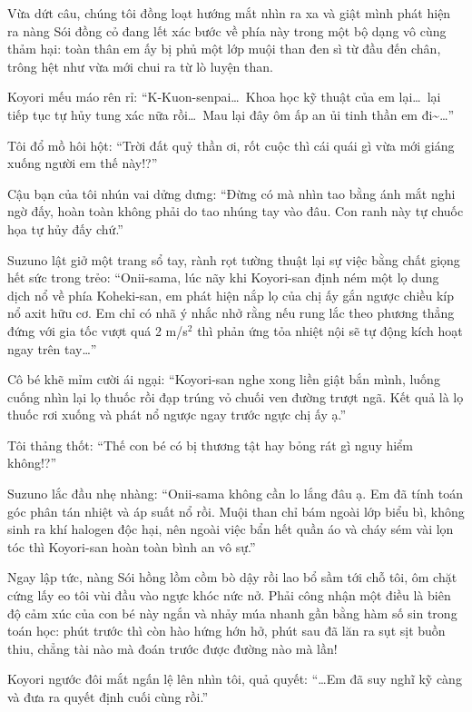 \documentclass[../main.tex]{subfiles}
\begin{document}
Vừa dứt câu, chúng tôi đồng loạt hướng mắt nhìn ra xa và giật mình phát hiện ra nàng Sói đồng cỏ đang lết xác bước về phía này trong một bộ dạng vô cùng thảm hại: toàn thân em ấy bị phủ một lớp muội than đen sì từ đầu đến chân, trông hệt như vừa mới chui ra từ lò luyện than.

Koyori mếu máo rên rỉ: ``K-Kuon-senpai\dots\ Khoa học kỹ thuật của em lại\dots\ lại tiếp tục tự hủy tung xác nữa rồi\dots\ Mau lại đây ôm ấp an ủi tinh thần em đi\~{}\dots''

Tôi đổ mồ hôi hột: ``Trời đất quỷ thần ơi, rốt cuộc thì cái quái gì vừa mới giáng xuống người em thế này!?''

Cậu bạn của tôi nhún vai dửng dưng: ``Đừng có mà nhìn tao bằng ánh mắt nghi ngờ đấy, hoàn toàn không phải do tao nhúng tay vào đâu. Con ranh này tự chuốc họa tự hủy đấy chứ.''

Suzuno lật giở một trang sổ tay, rành rọt tường thuật lại sự việc bằng chất giọng hết sức trong trẻo: ``Onii-sama, lúc nãy khi Koyori-san định ném một lọ dung dịch nổ về phía Koheki-san, em phát hiện nắp lọ của chị ấy gắn ngược chiều kíp nổ axit hữu cơ. Em chỉ có nhã ý nhắc nhở rằng nếu rung lắc theo phương thẳng đứng với gia tốc vượt quá 2 m/s$^2$ thì phản ứng tỏa nhiệt nội sẽ tự động kích hoạt ngay trên tay\dots''

Cô bé khẽ mỉm cười ái ngại: ``Koyori-san nghe xong liền giật bắn mình, luống cuống nhìn lại lọ thuốc rồi đạp trúng vỏ chuối ven đường trượt ngã. Kết quả là lọ thuốc rơi xuống và phát nổ ngược ngay trước ngực chị ấy ạ.''

Tôi thảng thốt: ``Thế con bé có bị thương tật hay bỏng rát gì nguy hiểm không!?''

Suzuno lắc đầu nhẹ nhàng: ``Onii-sama không cần lo lắng đâu ạ. Em đã tính toán góc phân tán nhiệt và áp suất nổ rồi. Muội than chỉ bám ngoài lớp biểu bì, không sinh ra khí halogen độc hại, nên ngoài việc bẩn hết quần áo và cháy sém vài lọn tóc thì Koyori-san hoàn toàn bình an vô sự.''

Ngay lập tức, nàng Sói hồng lồm cồm bò dậy rồi lao bổ sầm tới chỗ tôi, ôm chặt cứng lấy eo tôi vùi đầu vào ngực khóc nức nở. Phải công nhận một điều là biên độ cảm xúc của con bé này ngắn và nhảy múa nhanh gần bằng hàm số sin trong toán học: phút trước thì còn hào hứng hớn hở, phút sau đã lăn ra sụt sịt buồn thiu, chẳng tài nào mà đoán trước được đường nào mà lần!

Koyori ngước đôi mắt ngấn lệ lên nhìn tôi, quả quyết: ``\dots Em đã suy nghĩ kỹ càng và đưa ra quyết định cuối cùng rồi.''
\end{document}
